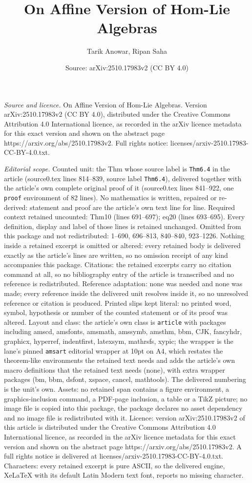 \documentclass[10pt,a4paper]{amsart}
\title[On Affine Version of Hom-Lie Algebras]{On Affine Version of Hom-Lie Algebras}
\author{Tarik Anowar, Ripan Saha}
\date{Source: arXiv:2510.17983v2 (CC BY 4.0)}
\begin{document}
\maketitle

\noindent\emph{Source and licence.} On Affine Version of Hom-Lie Algebras. Version arXiv:2510.17983v2 (CC BY 4.0), distributed under the Creative Commons Attribution 4.0 International licence, as recorded in the arXiv licence metadata for this exact version and shown on the abstract page https://arxiv.org/abs/2510.17983v2. Full rights notice: licenses/arxiv-2510.17983-CC-BY-4.0.txt.\par\smallskip

\noindent\textit{Editorial scope.} Counted unit: the Thm whose source label is \texttt{Thm6.4} in the article (source0.tex lines 814--839, source label \texttt{Thm6.4}), delivered together with the article's own complete original proof of it (source0.tex lines 841--922, one \texttt{proof} environment of 82 lines). No mathematics is written, repaired or re-derived: statement and proof are the article's own text line for line. Required context retained uncounted: Thm10 (lines 691--697); eq20 (lines 693--695). Every definition, display and label of those lines is retained unchanged. Omitted from this package and not redistributed: 1--690, 696--813, 840--840, 923--1226. Nothing inside a retained excerpt is omitted or altered: every retained body is delivered exactly as the article's lines are written, so no omission receipt of any kind accompanies this package. Citations: the retained excerpts carry no citation command at all, so no bibliography entry of the article is transcribed and no reference is redistributed. Reference adaptation: none was needed and none was made; every reference inside the delivered unit resolves inside it, so no unresolved reference or citation is produced. Printed slips kept literal: no printed word, symbol, hypothesis or number of the counted statement or of its proof was altered. Layout and class: the article's own class is \texttt{article} with packages including amscd, amsfonts, amsmath, amssymb, amsthm, bbm, CJK, fancyhdr, graphicx, hyperref, indentfirst, latexsym, mathrsfs, xypic; the wrapper is the lane's pinned \texttt{amsart} editorial wrapper at 10pt on A4, which restates the theorem-like environments the retained text needs and adds the article's own macro definitions that the retained text needs (none), with extra wrapper packages (bm, bbm, dsfont, xspace, cancel, mathtools). The delivered numbering is the unit's own. Assets: no retained span contains a figure environment, a graphics-inclusion command, a PDF-page inclusion, a table or a TikZ picture; no image file is copied into this package, the package declares no asset dependency and no image file is redistributed with it. Licence: version arXiv:2510.17983v2 of this article is distributed under the Creative Commons Attribution 4.0 International licence, as recorded in the arXiv licence metadata for this exact version and shown on the abstract page https://arxiv.org/abs/2510.17983v2. A full rights notice is delivered at licenses/arxiv-2510.17983-CC-BY-4.0.txt. Characters: every retained excerpt is pure ASCII, so the delivered engine, XeLaTeX with its default Latin Modern text font, reports no missing character.
\end{document}
